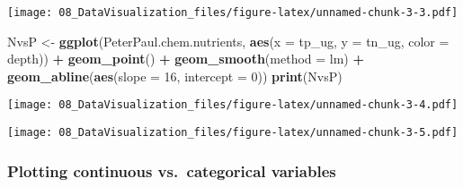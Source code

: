 \documentclass[
]{article}
\newenvironment{Shaded}{\begin{snugshade}}{\end{snugshade}}
\newcommand{\CommentTok}[1]{\textcolor[rgb]{0.56,0.35,0.01}{\textit{#1}}}
\newcommand{\DataTypeTok}[1]{\textcolor[rgb]{0.13,0.29,0.53}{#1}}
\newcommand{\DecValTok}[1]{\textcolor[rgb]{0.00,0.00,0.81}{#1}}
\newcommand{\FloatTok}[1]{\textcolor[rgb]{0.00,0.00,0.81}{#1}}
\newcommand{\KeywordTok}[1]{\textcolor[rgb]{0.13,0.29,0.53}{\textbf{#1}}}
\newcommand{\NormalTok}[1]{#1}
\newcommand{\OperatorTok}[1]{\textcolor[rgb]{0.81,0.36,0.00}{\textbf{#1}}}
\newcommand{\StringTok}[1]{\textcolor[rgb]{0.31,0.60,0.02}{#1}}
\begin{document}
\texttt{[image: 08\_DataVisualization\_files/figure-latex/unnamed-chunk-3-3.pdf]}

\begin{Shaded}
\begin{Highlighting}[]
\NormalTok{NvsP <-}
\StringTok{  }\KeywordTok{ggplot}\NormalTok{(PeterPaul.chem.nutrients, }\KeywordTok{aes}\NormalTok{(}\DataTypeTok{x =}\NormalTok{ tp_ug, }\DataTypeTok{y =}\NormalTok{ tn_ug, }\DataTypeTok{color =}\NormalTok{ depth)) }\OperatorTok{+}
\StringTok{  }\KeywordTok{geom_point}\NormalTok{() }\OperatorTok{+}
\StringTok{  }\KeywordTok{geom_smooth}\NormalTok{(}\DataTypeTok{method =}\NormalTok{ lm) }\OperatorTok{+}
\StringTok{  }\KeywordTok{geom_abline}\NormalTok{(}\KeywordTok{aes}\NormalTok{(}\DataTypeTok{slope =} \DecValTok{16}\NormalTok{, }\DataTypeTok{intercept =} \DecValTok{0}\NormalTok{))}
\KeywordTok{print}\NormalTok{(NvsP)}
\end{Highlighting}
\end{Shaded}

\texttt{[image: 08\_DataVisualization\_files/figure-latex/unnamed-chunk-3-4.pdf]}

\begin{Shaded}
\end{Shaded}

\texttt{[image: 08\_DataVisualization\_files/figure-latex/unnamed-chunk-3-5.pdf]}

\hypertarget{plotting-continuous-vs.-categorical-variables}{%
\subsubsection{Plotting continuous vs.~categorical
variables}\label{plotting-continuous-vs.-categorical-variables}}
\end{document}
